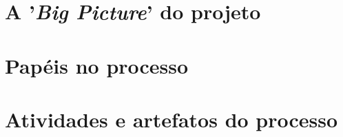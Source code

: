   \section{A '\textit{Big Picture}' do projeto}

      
    
  \pagebreak
  \section{Papéis no processo}
    
    
    
  \pagebreak
  \section{Atividades e artefatos do processo}
      
    
	